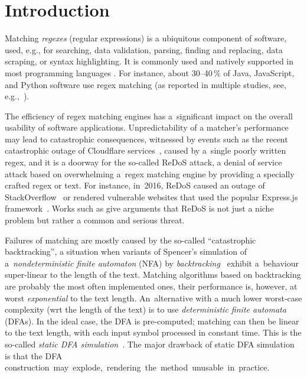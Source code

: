 \documentclass[acmsmall,screen]{acmart}
\begin{document}
\maketitle




\section{Introduction}\label{sec:intro}

Matching \emph{regexes} (regular expressions) is a ubiquitous component of software, 
used, e.g., for searching, data validation, parsing, finding and replacing, data
scraping, or syntax highlighting. It is commonly used and natively supported in most programming languages \cite{regexwiki}.
For instance, about 30--40\,\% of Java, JavaScript, and Python software use
regex matching (as reported in multiple studies, see, e.g.,~\cite{rethinkingregexes}).

The efficiency of regex matching engines has a~significant impact on the overall
usability of software applications.
%
Unpredictability of a matcher's performance may lead to catastrophic consequences,
witnessed by events such as the recent catastrophic outage of Cloudflare
services~\cite{cloudfareoutage}, 
caused by a~single poorly written regex,
and it is a doorway for the so-called ReDoS attack, 
a denial of service attack based on overwhelming a~regex matching engine by providing a specially crafted regex or text.
%
For instance, in~2016, ReDoS caused an outage of StackOverflow~\cite{stackoutage} 
or rendered vulnerable websites that used the popular Express.js framework~\cite{expressjsoutage}.
%
Works such as \cite{rethinkingregexes,redosimpact} give arguments that ReDoS is not just a niche problem but rather a common and serious threat.

Failures of matching are mostly caused by the so-called ``catastrophic
backtracking'', a situation when variants of Spencer's simulation of
a~\emph{nondeterministic finite automaton} (NFA) by
\emph{backtracking}~\cite{spencermatching} exhibit a~behaviour super-linear to
the length of the text.
Matching algorithms based on backtracking are probably the most often implemented ones,
their performance is, however, at worst \emph{exponential} to the text length.
%
An~alternative with a much lower worst-case complexity (wrt the length of the
text) is to use \emph{deterministic finite automata} (DFAs).
%
In the ideal case, the DFA is pre-computed; matching can then be linear to the text length, 
with each input symbol processed in constant time.
This is the so-called \emph{static DFA simulation}~\cite{sipser}. 
%
The major drawback of static DFA simulation is that the DFA \mbox{construction may explode,
rendering the method unusable in practice.}
\end{document}
